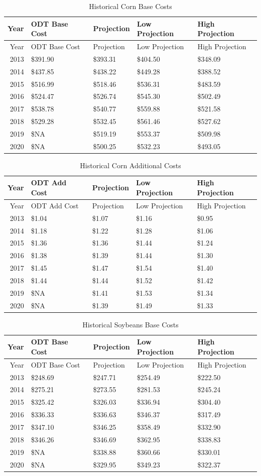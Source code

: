 \documentclass[]{article}
\begin{document}
\newpage

\begin{longtable}[]{@{}rllll@{}}
\caption{Historical Corn Base Costs}\tabularnewline
\toprule
Year & ODT Base Cost & Projection & Low Projection & High
Projection\tabularnewline
\midrule
\endfirsthead
\toprule
Year & ODT Base Cost & Projection & Low Projection & High
Projection\tabularnewline
\midrule
\endhead
2013 & \$391.90 & \$393.31 & \$404.50 & \$348.09\tabularnewline
2014 & \$437.85 & \$438.22 & \$449.28 & \$388.52\tabularnewline
2015 & \$516.99 & \$518.46 & \$536.31 & \$483.59\tabularnewline
2016 & \$524.47 & \$526.74 & \$545.30 & \$502.49\tabularnewline
2017 & \$538.78 & \$540.77 & \$559.88 & \$521.58\tabularnewline
2018 & \$529.28 & \$532.45 & \$561.46 & \$527.62\tabularnewline
2019 & \$NA & \$519.19 & \$553.37 & \$509.98\tabularnewline
2020 & \$NA & \$500.25 & \$532.23 & \$493.05\tabularnewline
\bottomrule
\end{longtable}

\begin{longtable}[]{@{}rllll@{}}
\caption{Historical Corn Additional Costs}\tabularnewline
\toprule
Year & ODT Add Cost & Projection & Low Projection & High
Projection\tabularnewline
\midrule
\endfirsthead
\toprule
Year & ODT Add Cost & Projection & Low Projection & High
Projection\tabularnewline
\midrule
\endhead
2013 & \$1.04 & \$1.07 & \$1.16 & \$0.95\tabularnewline
2014 & \$1.18 & \$1.22 & \$1.28 & \$1.06\tabularnewline
2015 & \$1.36 & \$1.36 & \$1.44 & \$1.24\tabularnewline
2016 & \$1.38 & \$1.39 & \$1.44 & \$1.30\tabularnewline
2017 & \$1.45 & \$1.47 & \$1.54 & \$1.40\tabularnewline
2018 & \$1.44 & \$1.44 & \$1.52 & \$1.42\tabularnewline
2019 & \$NA & \$1.41 & \$1.53 & \$1.34\tabularnewline
2020 & \$NA & \$1.39 & \$1.49 & \$1.33\tabularnewline
\bottomrule
\end{longtable}

\newpage

\begin{longtable}[]{@{}rllll@{}}
\caption{Historical Soybeans Base Costs}\tabularnewline
\toprule
Year & ODT Base Cost & Projection & Low Projection & High
Projection\tabularnewline
\midrule
\endfirsthead
\toprule
Year & ODT Base Cost & Projection & Low Projection & High
Projection\tabularnewline
\midrule
\endhead
2013 & \$248.69 & \$247.71 & \$254.49 & \$222.50\tabularnewline
2014 & \$275.21 & \$273.55 & \$281.53 & \$245.24\tabularnewline
2015 & \$325.42 & \$326.03 & \$336.94 & \$304.40\tabularnewline
2016 & \$336.33 & \$336.63 & \$346.37 & \$317.49\tabularnewline
2017 & \$347.10 & \$346.25 & \$358.49 & \$332.90\tabularnewline
2018 & \$346.26 & \$346.69 & \$362.95 & \$338.83\tabularnewline
2019 & \$NA & \$338.88 & \$360.66 & \$330.01\tabularnewline
2020 & \$NA & \$329.95 & \$349.23 & \$322.37\tabularnewline
\bottomrule
\end{longtable}
\end{document}

